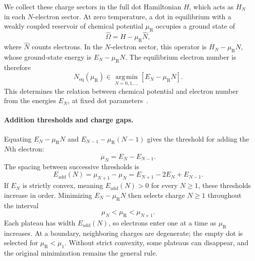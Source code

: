 We collect these charge sectors in the full dot Hamiltonian $H$,
which acts as $H_N$ in each $N$-electron sector.
At zero temperature, a dot in equilibrium with a weakly coupled
reservoir of chemical potential $\mu_{\mathrm R}$ occupies a
ground state of
\begin{equation}
  \widehat{\Omega}=H-\mu_{\mathrm R}\widehat N,
  \label{eq:dot-grand-canonical-hamiltonian}
\end{equation}
where $\widehat N$ counts electrons. In the $N$-electron sector,
this operator is $H_N-\mu_{\mathrm R}N$, whose ground-state
energy is $E_N-\mu_{\mathrm R}N$.
The equilibrium electron number is therefore
\begin{equation}
  \boxed{
  N_{\mathrm{eq}}(\mu_{\mathrm R})
    \in\operatorname*{arg\,min}_{N=0,1,\ldots}
                         [E_N-\mu_{\mathrm R}N]}.
  \label{eq:dot-equilibrium-electron-number}
\end{equation}
This determines the relation between chemical potential and
electron number from the energies $E_N$, at fixed dot parameters~\cite{Beenakker1991}.

\paragraph{Addition thresholds and charge gaps.}
Equating $E_N-\mu_{\mathrm R}N$ and
$E_{N-1}-\mu_{\mathrm R}(N-1)$ gives the threshold for adding
the $N$th electron:
\begin{equation}
  \mu_N=E_N-E_{N-1}.
  \label{eq:dot-addition-threshold}
\end{equation}
The spacing between successive thresholds is
\begin{equation}
  E_{\mathrm{add}}(N)=\mu_{N+1}-\mu_N
       =E_{N+1}-2E_N+E_{N-1}.
  \label{eq:dot-addition-energy-spacing}
\end{equation}
If $E_N$ is strictly convex, meaning $E_{\mathrm{add}}(N)>0$
for every $N\geq1$, these thresholds increase in order.
Minimizing $E_N-\mu_{\mathrm R}N$ then selects charge $N\geq1$
throughout the interval
\begin{equation}
  \mu_N<\mu_{\mathrm R}<\mu_{N+1}.
  \label{eq:dot-charge-stability-window}
\end{equation}
Each plateau has width $E_{\mathrm{add}}(N)$, so electrons enter
one at a time as $\mu_{\mathrm R}$ increases. At a boundary,
neighboring charges are degenerate; the empty dot is selected
for $\mu_{\mathrm R}<\mu_1$. Without strict convexity, some
plateaus can disappear, and the original minimization remains
the general rule.

